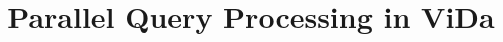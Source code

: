 \documentclass[11pt]{article}
\begin{document}
\title{Parallel Query Processing in ViDa}
 
 
\end{document}
